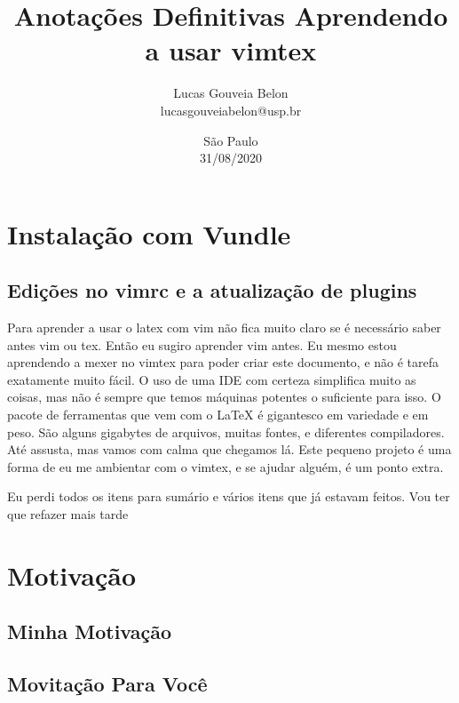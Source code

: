\documentclass[a4paper, 12pt]{article}
\begin{document}
\title{
    \textbf{
    Anotações Definitivas
    }
    \break
    Aprendendo a usar vimtex
}
\author{
    Lucas Gouveia Belon
    \\
    lucasgouveiabelon@usp.br
}

\date{\vspace{2.2cm}São Paulo\\31/08/2020}

\maketitle
\newpage
\tableofcontents
\newpage
\section{Instalação com Vundle}
\subsection{Edições no vimrc e a atualização de plugins}

Para aprender a usar o latex com vim não fica muito claro se é necessário saber antes vim ou tex. Então eu sugiro aprender vim antes. Eu mesmo estou aprendendo a mexer no vimtex para poder criar este documento, e não é tarefa exatamente muito fácil. O uso de uma IDE com certeza simplifica muito as coisas, mas não é sempre que temos máquinas potentes o suficiente para isso. O pacote de ferramentas que vem com o \LaTeX \hspace{0.5cm} é gigantesco em variedade e em peso. São alguns gigabytes de arquivos, muitas fontes, e diferentes compiladores. Até assusta, mas vamos com calma que chegamos lá. Este pequeno projeto é uma forma de eu me ambientar com o vimtex, e se ajudar alguém, é um ponto extra.

Eu perdi todos os itens para sumário e vários itens que já estavam feitos.
Vou ter que refazer mais tarde


\section{Motivação}
\subsection{Minha Motivação}
\subsection{Movitação Para Você}
\end{document}
